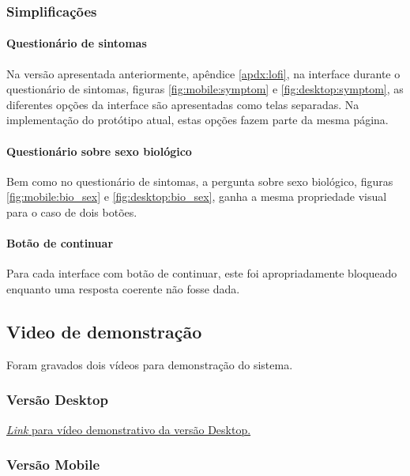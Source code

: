 \subsubsection{Simplificações}

\paragraph{Questionário de sintomas}

Na versão apresentada anteriormente, apêndice \ref{apdx:lofi}, na interface durante o questionário de sintomas, figuras \ref{fig:mobile:symptom} e \ref{fig:desktop:symptom}, as diferentes opções da interface são apresentadas como telas separadas.
Na implementação do protótipo atual, estas opções fazem parte da mesma página.

\paragraph{Questionário sobre sexo biológico}

Bem como no questionário de sintomas, a pergunta sobre sexo biológico, figuras \ref{fig:mobile:bio_sex} e \ref{fig:desktop:bio_sex}, ganha a mesma propriedade visual para o caso de dois botões.

\paragraph{Botão de continuar}

Para cada interface com botão de continuar, este foi apropriadamente bloqueado enquanto uma resposta coerente não fosse dada.

\subsection{Video de demonstração}\label{subsec:demo}

Foram gravados dois vídeos para demonstração do sistema.

\subsubsection{Versão Desktop}

\href{https://youtu.be/cfdYXQWT3AI}{\emph{Link} para vídeo demonstrativo da versão Desktop.}

\subsubsection{Versão Mobile}

